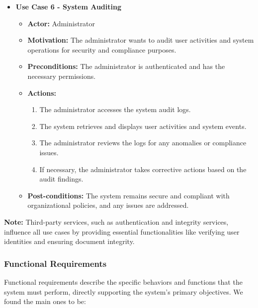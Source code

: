 \documentclass[a4paper,11pt]{article}
\begin{document}
\begin{itemize}
                    \item \textbf{Use Case 6 - System Auditing}
                    \begin{itemize}
                        \item \textbf{Actor:} Administrator
                        \item \textbf{Motivation:} The administrator wants to audit user activities and system operations for security and compliance purposes.
                        \item \textbf{Preconditions:} The administrator is authenticated and has the necessary permissions.
                        \pagebreak
                        \item \textbf{Actions:}
                        \begin{enumerate}
                            \item The administrator accesses the system audit logs.
                            \item The system retrieves and displays user activities and system events.
                            \item The administrator reviews the logs for any anomalies or compliance issues.
                            \item If necessary, the administrator takes corrective actions based on the audit findings.
                        \end{enumerate}
                        \item \textbf{Post-conditions:} The system remains secure and compliant with organizational policies, and any issues are addressed.
                    \end{itemize}
                \end{itemize}

                \textbf{Note:} Third-party services, such as authentication and integrity services, influence all use cases by providing essential functionalities like verifying user identities and ensuring document integrity.
    
            \subsubsection{Functional Requirements} \label{sec:fun-requirements}
            \quad Functional requirements describe the specific behaviors and functions that the system must perform, directly supporting the system's primary objectives. We found the main ones to be:
            
\end{document}
